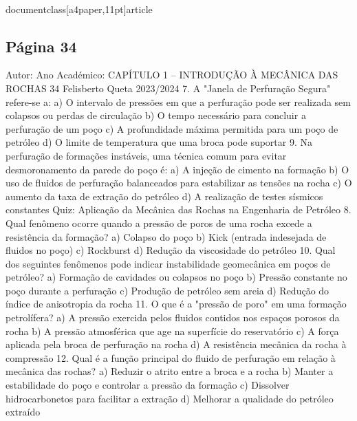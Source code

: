 \\documentclass[a4paper,11pt]{article}
\begin{document}
\subsection*{Página 34}
Autor:
Ano Académico:
CAPÍTULO 1 – INTRODUÇÃO À MECÂNICA DAS ROCHAS
34
Felisberto Queta
2023/2024
7. A "Janela de Perfuração Segura" refere-se a:
a) O intervalo de pressões em que a perfuração pode ser realizada sem colapsos ou perdas de circulação
b) O tempo necessário para concluir a perfuração de um poço
c) A profundidade máxima permitida para um poço de petróleo
d) O limite de temperatura que uma broca pode suportar
9. Na perfuração de formações instáveis, uma técnica comum para evitar desmoronamento da parede do poço é:
a) A injeção de cimento na formação
b) O uso de fluidos de perfuração balanceados para estabilizar as tensões na rocha
c) O aumento da taxa de extração do petróleo
d) A realização de testes sísmicos constantes
Quiz: Aplicação da 
Mecânica das 
Rochas na 
Engenharia de 
Petróleo
8. Qual fenômeno ocorre quando a pressão de poros de uma rocha excede a resistência da formação?
a) Colapso do poço
b) Kick (entrada indesejada de fluidos no poço)
c) Rockburst
d) Redução da viscosidade do petróleo
10. Qual dos seguintes fenômenos pode indicar instabilidade geomecânica em poços de petróleo?
a) Formação de cavidades ou colapsos no poço
b) Pressão constante no poço durante a perfuração
c) Produção de petróleo sem areia
d) Redução do índice de anisotropia da rocha
11. O que é a "pressão de poro" em uma formação petrolífera?
a) A pressão exercida pelos fluidos contidos nos espaços porosos da rocha
b) A pressão atmosférica que age na superfície do reservatório
c) A força aplicada pela broca de perfuração na rocha
d) A resistência mecânica da rocha à compressão
12. Qual é a função principal do fluido de perfuração em relação à mecânica das rochas?
a) Reduzir o atrito entre a broca e a rocha
b) Manter a estabilidade do poço e controlar a pressão da formação
c) Dissolver hidrocarbonetos para facilitar a extração
d) Melhorar a qualidade do petróleo extraído
\end{document}
